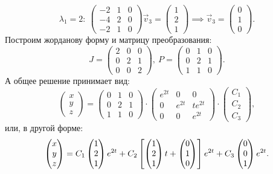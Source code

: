 \begin{enumerate}
				\[ \lambda_1 = 2: ~ \begin{pmatrix} -2 & 1 & 0 \\ -4 & 2 & 0 \\ -2 & 1 & 0 \end{pmatrix} \vec{v}_3 = \begin{pmatrix} 1 \\ 2 \\ 1 \end{pmatrix} \implies \vec{v}_3 = \begin{pmatrix} 0 \\ 1 \\ 0 \end{pmatrix}. \]
				Построим жорданову форму и матрицу преобразования:
				\[ J = \begin{pmatrix} 2 & 0 & 0 \\ 0 & 2 & 1 \\ 0 & 0 & 2 \end{pmatrix}, ~ P = \begin{pmatrix} 0 & 1 & 0 \\ 0 & 2 & 1 \\ 1 & 1 & 0 \end{pmatrix}. \]
				А общее решение принимает вид:
				\[ \begin{pmatrix} x \\ y \\ z \end{pmatrix} = \begin{pmatrix} 0 & 1 & 0 \\ 0 & 2 & 1 \\ 1 & 1 & 0 \end{pmatrix} \cdot \begin{pmatrix} e^{2t} & 0 & 0 \\ 0 & e^{2t} & te^{2t} \\ 0 & 0 & e^{2t} \end{pmatrix} \cdot \begin{pmatrix} C_1 \\ C_2 \\ C_3 \end{pmatrix}, \]
				или, в другой форме:
				\[ \begin{pmatrix} x \\ y \\ z \end{pmatrix} = C_1 \begin{pmatrix} 1 \\ 2 \\ 1 \end{pmatrix} e^{2t} + C_2 \left[ \begin{pmatrix} 1 \\ 2 \\ 1 \end{pmatrix} t + \begin{pmatrix} 0 \\ 1 \\ 0 \end{pmatrix} \right] e^{2t} + C_3 \begin{pmatrix} 0 \\ 0 \\ 1 \end{pmatrix} e^{2t}. \]
		
		\end{enumerate}

	\pagebreak